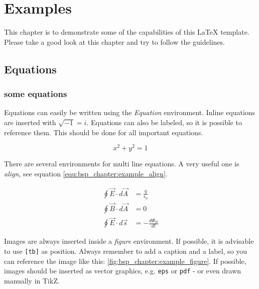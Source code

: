 
\chapter{Examples}

This chapter is to demonstrate some of the capabilities of this \LaTeX{} template.
Please take a good look at this chapter and try to follow the guidelines.

\section{Equations}
\subsection{some equations}
%
\glspl{Equation} can easily be written using the \emph{\gls{Equation}}
environment. Inline equations are inserted with $\sqrt{-1} = i $. Equations can
also be labeled, so it is possible to reference them. This should be done for
all important equations.

\begin{equation}
    x^2 + y^2 = 1
    \label{equ:bsp_chapter:example_equation}
\end{equation}

There are several environments for multi line equations. A very useful one
is \emph{align}, see equation \eqref{equ:bsp_chapter:example_align}.

\begin{align}
    \oint \vec{E} \cdot d \vec{A} &= \frac{q}{\epsilon_0} \\
    \oint \vec{B} \cdot d \vec{A} &= 0 \\
    \oint \vec{E} \cdot d \vec{s} &= - \frac{d \Phi_B}{dt}
    \label{equ:bsp_chapter:example_align}
\end{align}

%
Images are always inserted inside a \emph{figure}
environment. If possible, it is advisable to use \texttt{[tb]} as position.
Always remember to add a caption and a label, so you can reference the image
like this: \autoref{fig:bsp_chapter:example_figure}. If possible, images should be
inserted as vector graphics, e.g. \texttt{eps} or \texttt{pdf} - or even drawn
manually in TikZ.

